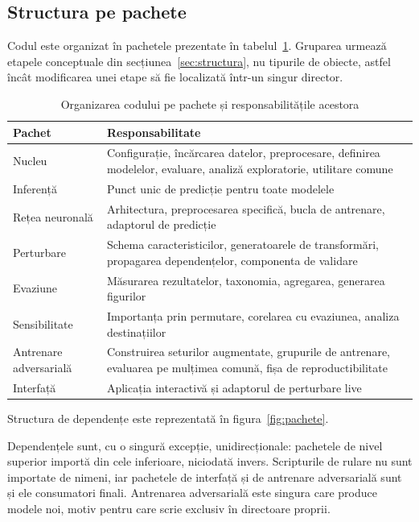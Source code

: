 \subsection{Structura pe pachete}\label{subsec:pachete}

Codul este organizat în pachetele prezentate în tabelul~\ref{tab:pachete}. Gruparea urmează etapele conceptuale din secțiunea~\ref{sec:structura}, nu tipurile de obiecte, astfel încât modificarea unei etape să fie localizată într-un singur director.

\begin{table}[H]
    \caption{Organizarea codului pe pachete și responsabilitățile acestora}
    \centering
    \begin{tabular}{|l|p{8.4cm}|}
        \hline
        \textbf{Pachet} & \textbf{Responsabilitate} \\
        \hline
        Nucleu & Configurație, încărcarea datelor, preprocesare, definirea modelelor, evaluare, analiză exploratorie, utilitare comune \\
        \hline
        Inferență & Punct unic de predicție pentru toate modelele \\
        \hline
        Rețea neuronală & Arhitectura, preprocesarea specifică, bucla de antrenare, adaptorul de predicție \\
        \hline
        Perturbare & Schema caracteristicilor, generatoarele de transformări, propagarea dependențelor, componenta de validare \\
        \hline
        Evaziune & Măsurarea rezultatelor, taxonomia, agregarea, generarea figurilor \\
        \hline
        Sensibilitate & Importanța prin permutare, corelarea cu evaziunea, analiza destinațiilor \\
        \hline
        Antrenare adversarială & Construirea seturilor augmentate, grupurile de antrenare,
        evaluarea pe mulțimea comună, fișa de reproductibilitate \\
        \hline
        Interfață & Aplicația interactivă și adaptorul de perturbare live \\
        \hline
    \end{tabular}
    \label{tab:pachete}
\end{table}

Structura de dependențe este reprezentată în figura~\ref{fig:pachete}.

Dependențele sunt, cu o singură excepție, unidirecționale: pachetele de nivel superior importă din cele inferioare, niciodată invers. Scripturile de rulare nu sunt importate de nimeni, iar pachetele de interfață și de antrenare adversarială sunt și ele consumatori finali. Antrenarea adversarială este singura care produce modele noi, motiv pentru care scrie exclusiv în directoare proprii.

